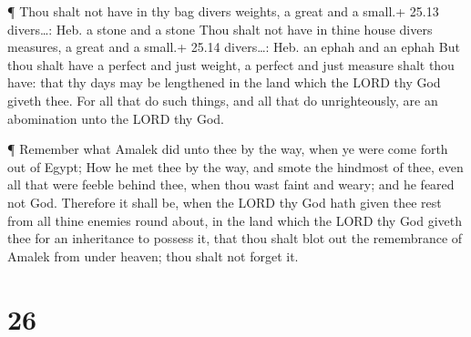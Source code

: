  ¶ Thou shalt not have in thy bag divers weights, a great
and a small.+ 25.13 divers\ldots: Heb. a stone and a stone 
Thou shalt not have in thine house divers measures, a great and a
small.+ 25.14 divers\ldots: Heb. an ephah and an ephah  But
thou shalt have a perfect and just weight, a perfect and just measure
shalt thou have: that thy days may be lengthened in the land which the
LORD thy God giveth thee.  For all that do such things, and
all that do unrighteously, are an abomination unto the LORD thy God.

 ¶ Remember what Amalek did unto thee by the way, when ye
were come forth out of Egypt;  How he met thee by the way,
and smote the hindmost of thee, even all that were feeble behind thee,
when thou wast faint and weary; and he feared not God. 
Therefore it shall be, when the LORD thy God hath given thee rest from
all thine enemies round about, in the land which the LORD thy God giveth
thee for an inheritance to possess it, that thou shalt blot out the
remembrance of Amalek from under heaven; thou shalt not forget it.

\hypertarget{section-25}{%
\section{26}\label{section-25}}

